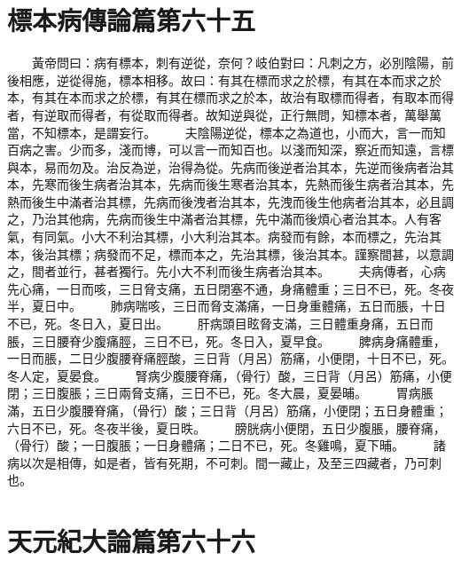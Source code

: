 \section{標本病傳論篇第六十五}

　　黃帝問曰：病有標本，刺有逆從，奈何？岐伯對曰：凡刺之方，必別陰陽，前後相應，逆從得施，標本相移。故曰：有其在標而求之於標，有其在本而求之於本，有其在本而求之於標，有其在標而求之於本，故治有取標而得者，有取本而得者，有逆取而得者，有從取而得者。故知逆與從，正行無問，知標本者，萬舉萬當，不知標本，是謂妄行。
　　夫陰陽逆從，標本之為道也，小而大，言一而知百病之害。少而多，淺而博，可以言一而知百也。以淺而知深，察近而知遠，言標與本，易而勿及。治反為逆，治得為從。先病而後逆者治其本，先逆而後病者治其本，先寒而後生病者治其本，先病而後生寒者治其本，先熱而後生病者治其本，先熱而後生中滿者治其標，先病而後洩者治其本，先洩而後生他病者治其本，必且調之，乃治其他病，先病而後生中滿者治其標，先中滿而後煩心者治其本。人有客氣，有同氣。小大不利治其標，小大利治其本。病發而有餘，本而標之，先治其本，後治其標；病發而不足，標而本之，先治其標，後治其本。謹察間甚，以意調之，間者並行，甚者獨行。先小大不利而後生病者治其本。
　　夫病傳者，心病先心痛，一日而咳，三日脅支痛，五日閉塞不通，身痛體重；三日不已，死。冬夜半，夏日中。
　　肺病喘咳，三日而脅支滿痛，一日身重體痛，五日而脹，十日不已，死。冬日入，夏日出。
　　肝病頭目眩脅支滿，三日體重身痛，五日而脹，三日腰脊少腹痛脛，三日不已，死。冬日入，夏早食。
　　脾病身痛體重，一日而脹，二日少腹腰脊痛脛酸，三日背（月呂）筋痛，小便閉，十日不已，死。冬人定，夏晏食。
　　腎病少腹腰脊痛，（骨行）酸，三日背（月呂）筋痛，小便閉；三日腹脹；三日兩脅支痛，三日不已，死。冬大晨，夏晏晡。
　　胃病脹滿，五日少腹腰脊痛，（骨行）酸；三日背（月呂）筋痛，小便閉；五日身體重；六日不已，死。冬夜半後，夏日昳。
　　膀胱病小便閉，五日少腹脹，腰脊痛，（骨行）酸；一日腹脹；一日身體痛；二日不已，死。冬雞鳴，夏下晡。
　　諸病以次是相傳，如是者，皆有死期，不可刺。間一藏止，及至三四藏者，乃可刺也。


\section{天元紀大論篇第六十六}

